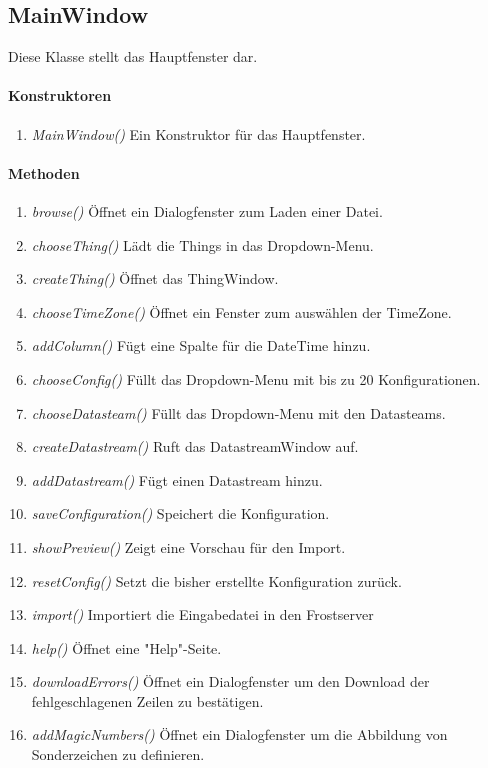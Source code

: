 
\subsection{MainWindow}
Diese Klasse stellt das Hauptfenster dar. 

\paragraph{Konstruktoren}
\begin{enumerate}[+]
	\item \textit{MainWindow()} Ein Konstruktor für das Hauptfenster.
\end{enumerate}

\paragraph{Methoden}

\begin{enumerate}[+]
	\item \textit{browse()} Öffnet ein Dialogfenster zum Laden einer Datei.
	\item \textit{chooseThing()} Lädt die Things in das Dropdown-Menu.
	\item \textit{createThing()} Öffnet das ThingWindow.
	\item \textit{chooseTimeZone()} Öffnet ein Fenster zum auswählen der TimeZone.
	\item \textit{addColumn()} Fügt eine Spalte für die DateTime hinzu.
	\item \textit{chooseConfig()} Füllt das Dropdown-Menu mit bis zu 20 Konfigurationen.
	\item \textit{chooseDatasteam()} Füllt das Dropdown-Menu mit den Datasteams.
	\item \textit{createDatastream()} Ruft das DatastreamWindow auf.
	\item \textit{addDatastream()} Fügt einen Datastream hinzu.
	\item \textit{saveConfiguration()} Speichert die Konfiguration.
	\item \textit{showPreview()} Zeigt eine Vorschau für den Import.
	\item \textit{resetConfig()} Setzt die bisher erstellte Konfiguration zurück.
	\item \textit{import()} Importiert die Eingabedatei in den Frostserver
	\item \textit{help()} Öffnet eine "{Help}"{-Seite}.
	\item \textit{downloadErrors()} Öffnet ein Dialogfenster um den Download der fehlgeschlagenen Zeilen zu bestätigen.
	\item \textit{addMagicNumbers()} Öffnet ein Dialogfenster um die Abbildung von Sonderzeichen zu definieren.	
\end{enumerate}



